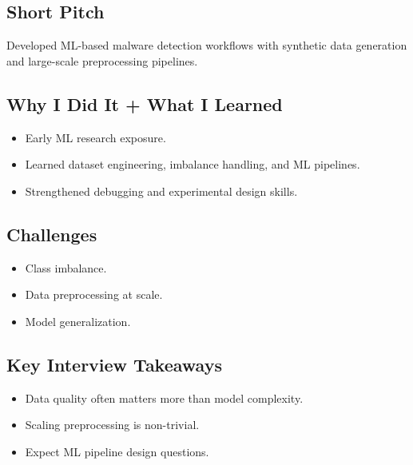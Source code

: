 \documentclass[11pt]{article}
\begin{document}
\subsection{Short Pitch}
Developed ML-based malware detection workflows with synthetic data
generation and large-scale preprocessing pipelines.

\subsection{Why I Did It + What I Learned}
\begin{itemize}
\item Early ML research exposure.
\item Learned dataset engineering, imbalance handling, and ML pipelines.
\item Strengthened debugging and experimental design skills.
\end{itemize}

\subsection{Challenges}
\begin{itemize}
\item Class imbalance.
\item Data preprocessing at scale.
\item Model generalization.
\end{itemize}

\subsection{Key Interview Takeaways}
\begin{itemize}
\item Data quality often matters more than model complexity.
\item Scaling preprocessing is non-trivial.
\item Expect ML pipeline design questions.
\end{itemize}
\end{document}
